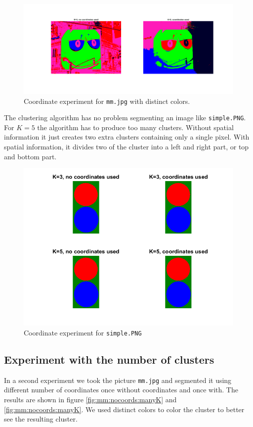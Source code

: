\begin{figure}[h!]
\centering
\includegraphics[width = 0.9\linewidth]{figures/task2/mm_bad_visibility.png}
\caption{Coordinate experiment for \texttt{mm.jpg} with distinct colors.}
\label{fig:mm:coords:distinct}
\end{figure}

The clustering algorithm has no problem segmenting an image like \texttt{simple.PNG}. For $K=5$ the algorithm has to produce too many clusters. Without spatial information it just creates two extra clusters containing only a single pixel. With spatial information, it divides two of the cluster into a left and right part, or top and bottom part.

\begin{figure}[h!]
\centering
\includegraphics[width = 0.7\linewidth]{figures/task2/simple_coordinates.png}
\caption{Coordinate experiment for \texttt{simple.PNG}}
\label{fig:simple:coords}
\end{figure}

\subsection{Experiment with the number of clusters}
In a second experiment we took the picture \texttt{mm.jpg} and segmented it using different number of coordinates once without coordinates and once with. The results are shown in figure \ref{fig:mm:nocoords:manyK} and \ref{fig:mm:nocoords:manyK}. We used distinct colors to color the cluster to better see the resulting cluster.

